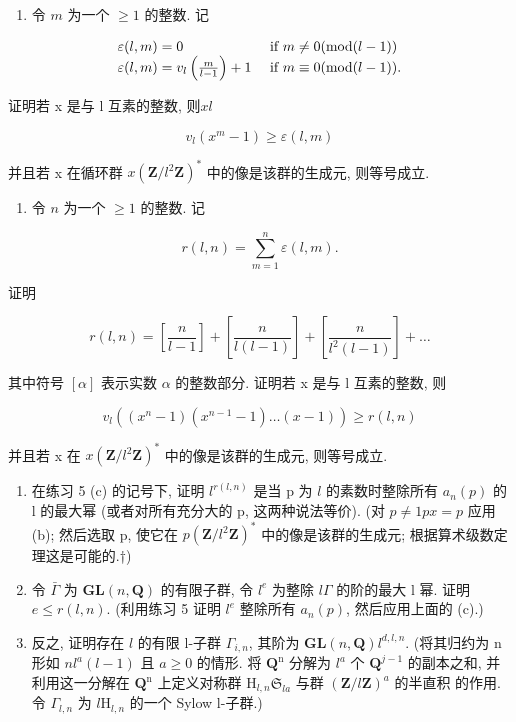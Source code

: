 \begin{enumerate}
\def\labelenumi{(\alph{enumi})}
\tightlist
\item
  令 \(m\) 为一个 \(\geqslant 1\) 的整数. 记
\end{enumerate}

\[
\begin{array}{l l} \varepsilon (l, m) = 0 & \text { if } m \neq 0 (\mathrm{mod} (l - 1)) \\ \varepsilon (l, m) = v _ {l} \left(\frac {m}{l - 1}\right) + 1 & \text { if } m \equiv 0 (\mathrm{mod} (l - 1)). \end{array}
\]

证明若 x 是与 l 互素的整数, 则\(x\)\(l\)

\[
v _ {l} (x ^ {m} - 1) \geqslant \varepsilon (l, m)
\]

并且若 x 在循环群 \(x\)\((\mathbf{Z} / l^2\mathbf{Z})^*\) 中的像是该群的生成元, 则等号成立.

\begin{enumerate}
\def\labelenumi{(\alph{enumi})}
\setcounter{enumi}{1}
\tightlist
\item
  令 \(n\) 为一个 \(\geqslant 1\) 的整数. 记
\end{enumerate}

\[
r (l, n) = \sum_ {m = 1} ^ {n} \varepsilon (l, m).
\]

证明

\[
r (l, n) = \left[ \frac {n}{l - 1} \right] + \left[ \frac {n}{l (l - 1)} \right] + \left[ \frac {n}{l ^ {2} (l - 1)} \right] + \dots
\]

其中符号 \([\alpha]\) 表示实数 \(\alpha\) 的整数部分. 证明若 x 是与 l 互素的整数, 则

\[
v _ {l} ((x ^ {n} - 1) (x ^ {n - 1} - 1) \dots (x - 1)) \geqslant r (l, n)
\]

并且若 x 在 \(x\)\((\mathbf{Z} / l^2\mathbf{Z})^*\) 中的像是该群的生成元, 则等号成立.

\begin{enumerate}
\def\labelenumi{(\alph{enumi})}
\setcounter{enumi}{2}
\item
在练习 5 (c) 的记号下, 证明 \(l^{r(l,n)}\) 是当 p 为 \(l\) 的素数时整除所有 \(a_{n}(p)\) 的 l 的最大幂 (或者对所有充分大的 p, 这两种说法等价). (对 \(p\)\(\neq 1\)\(p\)\(x = p\) 应用 (b); 然后选取 p, 使它在 \(p\)\((\mathbf{Z}/l^2\mathbf{Z})^*\) 中的像是该群的生成元; 根据算术级数定理这是可能的.†)
\item
  令 \(\bar{\Gamma}\) 为 \(\mathbf{GL}(n, \mathbf{Q})\) 的有限子群, 令 \(l^e\) 为整除 \(l\)\(\Gamma\) 的阶的最大 l 幂. 证明 \(e \leqslant r(l, n)\). (利用练习 5 证明 \(l^e\) 整除所有 \(a_n(p)\), 然后应用上面的 (c).)
\item
  反之, 证明存在 \(l\) 的有限 l-子群 \(\Gamma_{i,n}\), 其阶为 \(\mathbf{GL}(n,\mathbf{Q})\)\(l^{d,l,n}\). (将其归约为 n 形如 \(n\)\(l^a (l - 1)\) 且 \(a\geqslant 0\) 的情形. 将 \(\mathbf{Q}^{\mathrm{n}}\) 分解为 \(l^a\) 个 \(\mathbf{Q}^{j - 1}\) 的副本之和, 并利用这一分解在 \(\mathbf{Q}^{\mathrm{n}}\) 上定义对称群 \(\mathrm{H}_{l,n}\)\(\mathfrak{S}_{la}\) 与群 \((\mathbf{Z} / l\mathbf{Z})^{a}\) 的半直积  的作用. 令 \(\Gamma_{l,n}\) 为 \(l\)\(\mathrm{H}_{l,n}\) 的一个 Sylow l-子群.)
\end{enumerate}

